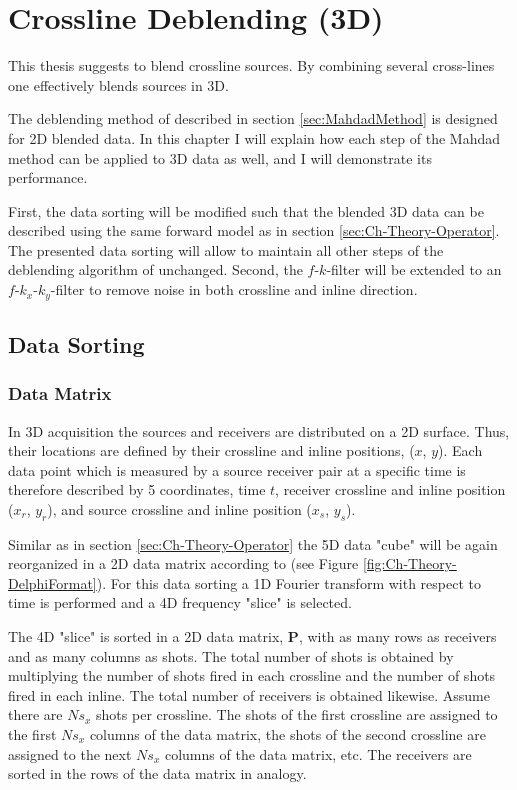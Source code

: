 \chapter{Crossline Deblending (3D)} \label{chap:MahdadMethod3d}

This thesis suggests to blend crossline sources. By combining several cross-lines one effectively blends sources in 3D.

The deblending method of \citet{Mahdad-Deblending-Method} described in section \ref{sec:MahdadMethod} is designed for 2D blended data. In this chapter I will explain how each step of the Mahdad method can be applied to 3D data as well, and I will demonstrate its performance.

First, the data sorting will be modified such that the blended 3D data can be described using the same forward model as in section \ref{sec:Ch-Theory-Operator}. The presented data sorting will allow to maintain all other steps of the deblending algorithm of \citet{Mahdad-Deblending-Method} unchanged. Second, the $f$-$k$-filter will be extended to an $f$-$k_x$-$k_y$-filter to remove noise in both crossline and inline direction.

\section{Data Sorting} \label{sec:Ch-Theory-3dExtension-DataSorting}

\subsection*{Data Matrix}

In 3D acquisition the sources and receivers are distributed on a 2D surface. Thus, their locations are defined by their crossline and inline positions, ($x$, $y$). Each data point which is measured by a source receiver pair at a specific time is therefore described by 5 coordinates, time $t$, receiver crossline and inline position ($x_r$, $y_r$), and source crossline and inline position ($x_s$, $y_s$).

Similar as in section \ref{sec:Ch-Theory-Operator} the 5D data "cube" will be again reorganized in a 2D data matrix according to \citet{Delphi-Format} (see Figure \ref{fig:Ch-Theory-DelphiFormat}). For this data sorting a 1D Fourier transform with respect to time is performed and a 4D frequency "slice" is selected.

The 4D "slice" is sorted in a 2D data matrix, $\mathbf{P}$, with as many rows as receivers and as many columns as shots. The total number of shots is obtained by multiplying the number of shots fired in each crossline and the number of shots fired in each inline. The total number of receivers is obtained likewise. Assume there are $Ns_x$ shots per crossline. The shots of the first crossline are assigned to the first $Ns_x$ columns of the data matrix, the shots of the second crossline are assigned to the next $Ns_x$ columns of the data matrix, etc. The receivers are sorted in the rows of the data matrix in analogy.

